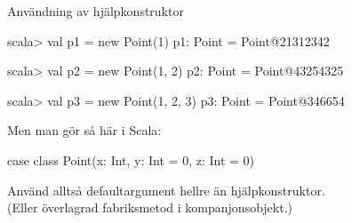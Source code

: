 \begin{Slide}{Användning av hjälpkonstruktor}
\begin{REPL}
scala> val p1 = new Point(1)
p1: Point = Point@21312342

scala> val p2 = new Point(1, 2)
p2: Point = Point@43254325

scala> val p3 = new Point(1, 2, 3)
p3: Point = Point@346654
\end{REPL}
\pause
Men man gör  så här i Scala:
\begin{Code}[basicstyle=\ttfamily\SlideFontSize{8.5}{12}]
case class Point(x: Int, y: Int = 0, z: Int = 0)
\end{Code}
Använd alltså defaultargument hellre än hjälpkonstruktor.\\
(Eller överlagrad fabriksmetod i kompanjonsobjekt.)
\end{Slide}



%
%
%
%
%


